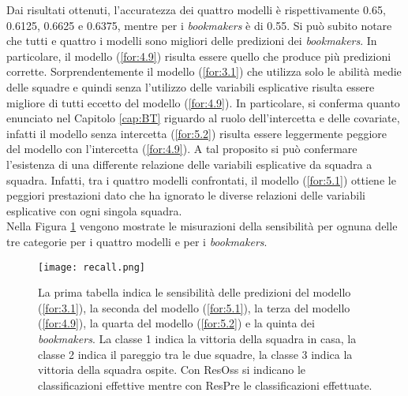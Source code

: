 Dai risultati ottenuti, l'accuratezza dei quattro modelli è rispettivamente 0.65, 0.6125, 0.6625 e 0.6375, mentre per i \emph{bookmakers} è di 0.55. Si può subito notare che tutti e quattro i modelli sono migliori delle predizioni dei \emph{bookmakers}. In particolare, il modello (\ref{for:4.9}) risulta essere quello che produce più predizioni corrette. Sorprendentemente il modello (\ref{for:3.1}) che utilizza solo le abilità medie delle squadre e quindi senza l'utilizzo delle variabili esplicative risulta essere migliore di tutti eccetto del modello (\ref{for:4.9}). In particolare, si conferma quanto enunciato nel Capitolo \ref{cap:BT} riguardo al ruolo dell'intercetta e delle covariate, infatti il modello senza intercetta (\ref{for:5.2}) risulta essere leggermente peggiore del modello con l'intercetta (\ref{for:4.9}). A tal proposito si può confermare l'esistenza di una differente relazione delle variabili esplicative da squadra a squadra. Infatti, tra i quattro modelli confrontati, il modello (\ref{for:5.1}) ottiene le peggiori prestazioni dato che ha ignorato le diverse relazioni delle variabili esplicative con ogni singola squadra.\\
Nella Figura \ref{fig:recall} vengono mostrate le misurazioni della sensibilità per ognuna delle tre categorie per i quattro modelli e per i \emph{bookmakers}.\\
\begin{figure}[h]
	\begin{center}
		\texttt{[image: recall.png]}
		\caption{La prima tabella indica le sensibilità delle predizioni del modello (\ref{for:3.1}), la seconda del modello (\ref{for:5.1}), la terza del modello (\ref{for:4.9}), la quarta del modello (\ref{for:5.2}) e la quinta dei \emph{bookmakers}. La classe 1 indica la vittoria della squadra in casa, la classe 2 indica il pareggio tra le due squadre, la classe 3 indica la vittoria della squadra ospite. Con \textsf{ResOss} si indicano le classificazioni effettive mentre con \textsf{ResPre} le classificazioni effettuate.}\label{fig:recall}
	\end{center}
\end{figure}
